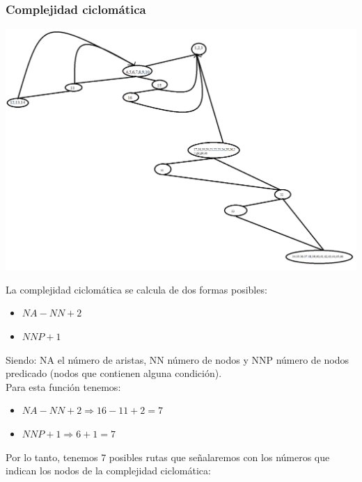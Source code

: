 \documentclass{book}
\begin{document}
\subsubsection{Complejidad ciclomática}
\begin{center}
	\includegraphics[scale=0.38]{ComplejidadCiclomatica.png}
\end{center}
La complejidad ciclomática se calcula de dos formas posibles:
\begin{itemize}
	\item $NA-NN+2$
	\item $NNP+1$
\end{itemize}
Siendo: NA el número de aristas, NN número de nodos y NNP número de nodos predicado (nodos que contienen alguna condición).\\
Para esta función tenemos:
\begin{itemize}
	\item $NA-NN+2 \Rightarrow 16-11+2=7$
	\item $NNP+1 \Rightarrow 6+1=7$
\end{itemize}
Por lo tanto, tenemos 7 posibles rutas que señalaremos con los números que indican los nodos de la complejidad ciclomática:
\end{document}
